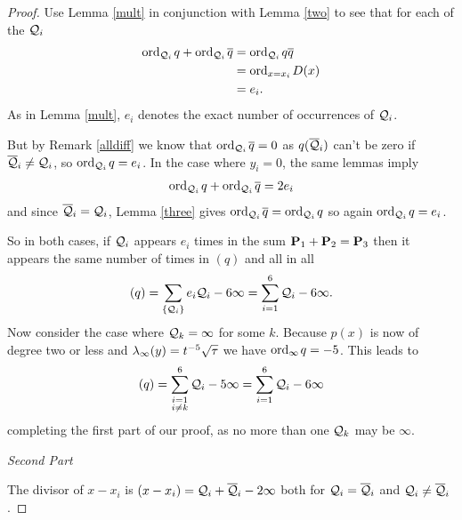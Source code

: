 \documentclass[english,11pt,a4paper]{article}
\begin{document}
\begin{proof}



  Use Lemma \ref{mult} in conjunction with Lemma \ref{two} to see that for each of the $\q_i$
  \begin{align*}
    \ordqi q + \ordqi \bar q &= \ordqi q \bar q\\
                    &= \text{ord}_{x=x_i}\hspace{0.4mm} D(x)\\
                    &= e_i.%
  \end{align*}
  As in Lemma \ref{mult}, $e_i$ denotes the exact number of occurrences of $\q_i$.%

  But by Remark \ref{alldiff} we know that $\ordqi \bar q = 0$ as $q(\bar \q_i)$ can't be zero if $\bar \q_i \neq \q_i$, so $\ordqi q = e_i$. In the case where $y_i = 0$, the same lemmas imply
  \begin{align*}
    \ordqi q + \ordqi \bar q = 2e_i
  \end{align*}
  and since $\bar \q_i = \q_i$, Lemma \ref{three} gives $\ordqi \bar q = \ordqi q$ so again $\ordqi q = e_i$.

  So in both cases, if $\q_i$ appears $e_i$ times in the sum $\P_1 + \P_2 = \P_3$ then it appears the same number of times in $(q)$ and all in all
  \begin{align*}
    (q) = \sum_{\{\q_i\}} e_i \q_i - 6 \infty = \sum_{i=1}^6 \q_i - 6 \infty.
  \end{align*}
  Now consider the case where $\q_k = \infty$ for some $k$. Because $p(x)$ is now of degree two or less and $\li(y) = t^{-5}\sqrt \tau$ we have $\ordi q = -5$. This leads to
  \begin{align*}
    (q) = \sum_{\substack{i=1 \\ i \neq k}}^6 \q_i - 5 \infty = \sum_{i=1}^6 \q_i - 6 \infty
  \end{align*}
  completing the first part of our proof, as no more than one $\q_k$ may be $\infty$.

\newpage
  \textit{Second Part}

  The divisor of $x - x_i$ is $(x - x_i) = \q_i + \bar \q_i -2 \infty$ both for $\q_i = \bar \q_i$ and $\q_i \neq \bar \q_i$.


\end{proof}
\end{document}
